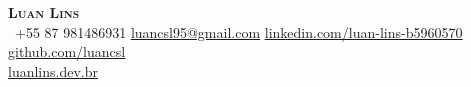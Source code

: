 \begin{center}
    \textbf{\Huge \scshape Luan Lins} \\ \vspace{5pt}
     \ \small +55 87 981486931 \quad
    \href{mailto:luancsl95@gmail.com}{ \underline{luancsl95@gmail.com}} \quad
    \href{https://www.linkedin.com/in/luan-lins-b5960570}{ \underline{linkedin.com/luan-lins-b5960570}} \quad
    \href{https://github.com/}{ \underline{github.com/luancsl}} \quad \\ \vspace{10pt}
    \href{https://luanlins.dev.br}{ \underline{luanlins.dev.br}}
\end{center}